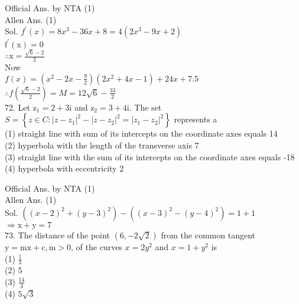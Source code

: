 \documentclass[10pt]{article}
\begin{document}
Official Ans. by NTA (1)\\
Allen Ans. (1)\\
Sol. \(f^{\prime}(x)=8 x^{3}-36 x+8=4\left(2 x^{3}-9 x+2\right)\)\\
\(\mathrm{f}^{\prime}(\mathrm{x})=0\)\\
\(\therefore \mathrm{x}=\frac{\sqrt{6}-2}{2}\)\\
Now\\
\(f(x)=\left(x^{2}-2 x-\frac{9}{2}\right)\left(2 x^{2}+4 x-1\right)+24 x+7.5\)\\
\(\therefore f\left(\frac{\sqrt{6}-2}{2}\right)=M=12 \sqrt{6}-\frac{33}{2}\)\\
72. Let \(\mathrm{z}_{1}=2+3 \mathrm{i}\) and \(\mathrm{z}_{2}=3+4 \mathrm{i}\). The set \(S=\left\{z \in C:\left|z-z_{1}\right|^{2}-\left|z-z_{2}\right|^{2}=\left|z_{1}-z_{2}\right|^{2}\right\}\) represents a\\
(1) straight line with sum of its intercepts on the coordinate axes equals 14\\
(2) hyperbola with the length of the transverse axis 7\\
(3) straight line with the sum of its intercepts on the coordinate axes equals -18\\
(4) hyperbola with eccentricity 2

Official Ans. by NTA (1)\\
Allen Ans. (1)\\
Sol. \(\left((x-2)^{2}+(y-3)^{2}\right)-\left((x-3)^{2}-(y-4)^{2}\right)=1+1\)\\
\(\Rightarrow \mathrm{x}+\mathrm{y}=7\)\\
73. The distance of the point \((6,-2 \sqrt{2})\) from the common tangent \(\mathrm{y}=\mathrm{mx}+\mathrm{c}, \mathrm{m}>0\), of the curves \(x=2 y^{2}\) and \(x=1+y^{2}\) is\\
(1) \(\frac{1}{3}\)\\
(2) 5\\
(3) \(\frac{14}{3}\)\\
(4) \(5 \sqrt{3}\)
\end{document}
